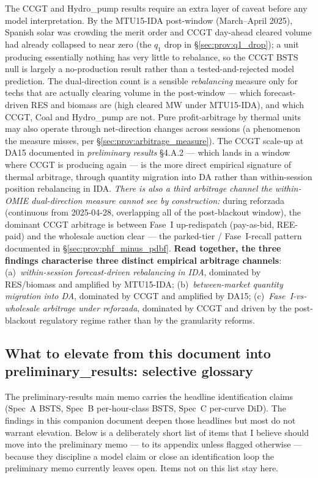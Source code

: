 \documentclass[11pt,a4paper]{article}
\begin{document}
\noindent The CCGT and Hydro\_pump results require an extra layer of caveat before any model interpretation. By the MTU15-IDA post-window (March--April 2025), Spanish solar was crowding the merit order and CCGT day-ahead cleared volume had already collapsed to near zero (the $q_1$ drop in \S\ref{sec:prov:q1_drop}); a unit producing essentially nothing has very little to rebalance, so the CCGT BSTS null is largely a no-production result rather than a tested-and-rejected model prediction. The dual-direction count is a sensible \emph{rebalancing} measure only for techs that are actually clearing volume in the post-window --- which forecast-driven RES and biomass are (high cleared MW under MTU15-IDA), and which CCGT, Coal and Hydro\_pump are not. Pure profit-arbitrage by thermal units may also operate through net-direction changes across sessions (a phenomenon the measure misses, per \S\ref{sec:prov:arbitrage_measure}). The CCGT scale-up at DA15 documented in \emph{preliminary results} \S 4.A.2 --- which lands in a window where CCGT is producing again --- is the more direct empirical signature of thermal arbitrage, through quantity migration into DA rather than within-session position rebalancing in IDA. \emph{There is also a third arbitrage channel the within-OMIE dual-direction measure cannot see by construction:} during reforzada (continuous from 2025-04-28, overlapping all of the post-blackout window), the dominant CCGT arbitrage is between Fase~I up-redispatch (pay-as-bid, REE-paid) and the wholesale auction clear --- the parked-tier / Fase~I-recall pattern documented in \S\ref{sec:prov:phf_minus_pdbf}. \textbf{Read together, the three findings characterise three distinct empirical arbitrage channels}: (a)~\emph{within-session forecast-driven rebalancing in IDA}, dominated by RES/biomass and amplified by MTU15-IDA; (b)~\emph{between-market quantity migration into DA}, dominated by CCGT and amplified by DA15; (c)~\emph{Fase~I-vs-wholesale arbitrage under reforzada}, dominated by CCGT and driven by the post-blackout regulatory regime rather than by the granularity reforms.

\subsection{What to elevate from this document into preliminary\_results: selective glossary}\label{sec:prov:elevation_glossary}

The preliminary-results main memo carries the headline identification claims (Spec~A BSTS, Spec~B per-hour-class BSTS, Spec~C per-curve DiD). The findings in this companion document deepen those headlines but most do not warrant elevation. Below is a deliberately short list of items that I believe should move into the preliminary memo --- to its appendix unless flagged otherwise --- because they discipline a model claim or close an identification loop the preliminary memo currently leaves open. Items not on this list stay here.
\end{document}
